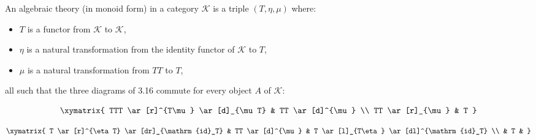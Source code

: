 An algebraic theory (in monoid form) in a category $\mathcal{K}$ is a triple $(T, \eta, \mu)$ where:
\begin{itemize}
\item $T$ is a functor from $\mathcal{K}$ to $\mathcal{K}$,
\item $\eta$ is a natural transformation from the identity functor of $\mathcal{K}$ to $T$,
\item $\mu$ is a natural transformation from $TT$ to $T$,
\end{itemize}
all such that the three diagrams of 3.16 commute for every object $A$ of $\mathcal{K}$:

$$\xymatrix{
TTT \ar[r]^{T\mu} \ar[d]_{\mu T} & TT \ar[d]^{\mu} \\
TT \ar[r]_{\mu} & T
}$$

$$\xymatrix{
T \ar[r]^{\eta T} \ar[dr]_{\mathrm{id}_T} & TT \ar[d]^{\mu} & T \ar[l]_{T\eta} \ar[dl]^{\mathrm{id}_T} \\
& T &
}$$
